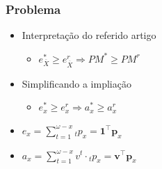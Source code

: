 \documentclass[11pt]{beamer}
\begin{document}
    \begin{frame}

        \frametitle{Problema}

        \begin{itemize}
            \item Interpretação do referido artigo
            
            \begin{itemize}
                \item[-] $e^{*}_{\overline{X}} \geq e^{r}_{\overline{X}} \Rightarrow PM^{*} \geq PM^{r}$
            \end{itemize}

            \medskip

            \item Simplificando a impliação
            \begin{itemize}
                \item[-] $e^{*}_{x} \geq e^{r}_{x} \Rightarrow a^{*}_{x} \geq a^{r}_{x}$
            \end{itemize}
            
            \medskip
            
            \item $e_{x} = \sum_{t=1}^{\omega-x} {}_{t}p_{x} = \mathbf{1}^\top \mathbf{p}_x$
            
            \item $a_{x} = \sum_{t=1}^{\omega-x} v^{t}\cdot {}_{t}p_{x} = \mathbf{v}^\top \mathbf{p}_x$
            
            \medskip

        \end{itemize}
        
    \end{frame}
\end{document}
